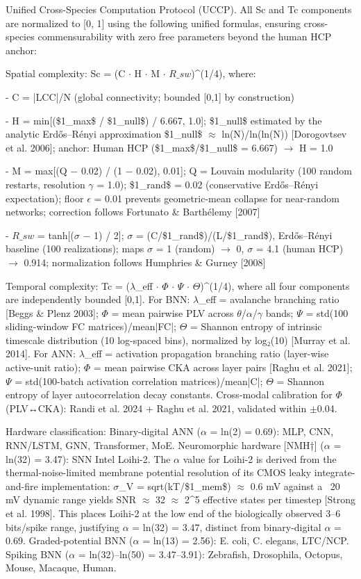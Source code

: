 \documentclass[a4paper,12pt]{article}
\begin{document}
Unified Cross-Species Computation Protocol (UCCP). All Sc and Tc components are normalized to [0, 1] using the following unified formulas, ensuring cross-species commensurability with zero free parameters beyond the human HCP anchor:


Spatial complexity: Sc = (C $\cdot$ H $\cdot$ M $\cdot$ $R\_{sw}$)^(1/4), where:


- C = |LCC|/N (global connectivity; bounded [0,1] by construction)


- H = min[(\$1_{max}\$ / \$1_{null}\$) / 6.667, 1.0]; \$1_{null}\$ estimated by the analytic Erdős–Rényi approximation \$1_{null}\$ $\approx$ ln(N)/ln(ln(N)) [Dorogovtsev et al. 2006]; anchor: Human HCP (\$1_{max}\$/\$1_{null}\$ = 6.667) $\rightarrow$ H = 1.0


- M = max[(Q − 0.02) / (1 − 0.02), 0.01]; Q = Louvain modularity (100 random restarts, resolution $\gamma$ = 1.0); \$1_{rand}\$ = 0.02 (conservative Erdős–Rényi expectation); floor $\epsilon$ = 0.01 prevents geometric-mean collapse for near-random networks; correction follows Fortunato \& Barthélemy [2007]


- $R\_{sw}$ = tanh[($\sigma$ − 1) / 2]; $\sigma$ = (C/\$1_{rand}\$)/(L/\$1_{rand}\$), Erdős–Rényi baseline (100 realizations); maps $\sigma$ = 1 (random) $\rightarrow$ 0, $\sigma$ = 4.1 (human HCP) $\rightarrow$ 0.914; normalization follows Humphries \& Gurney [2008]


Temporal complexity: Tc = ($\lambda$_eff $\cdot$ $\Phi$ $\cdot$ $\Psi$ $\cdot$ $\Theta$)^(1/4), where all four components are independently bounded [0,1]. For BNN: $\lambda$_eff = avalanche branching ratio [Beggs \& Plenz 2003]; $\Phi$ = mean pairwise PLV across $\theta$/$\alpha$/$\gamma$ bands; $\Psi$ = std(100 sliding-window FC matrices)/mean|FC|; $\Theta$ = Shannon entropy of intrinsic timescale distribution (10 log-spaced bins), normalized by log₂(10) [Murray et al. 2014]. For ANN: $\lambda$_eff = activation propagation branching ratio (layer-wise active-unit ratio); $\Phi$ = mean pairwise CKA across layer pairs [Raghu et al. 2021]; $\Psi$ = std(100-batch activation correlation matrices)/mean|C|; $\Theta$ = Shannon entropy of layer autocorrelation decay constants. Cross-modal calibration for $\Phi$ (PLV↔CKA): Randi et al. 2024 + Raghu et al. 2021, validated within $\pm$0.04.


Hardware classification: Binary-digital ANN ($\alpha$ = ln(2) = 0.69): MLP, CNN, RNN/LSTM, GNN, Transformer, MoE. Neuromorphic hardware [NMH†] ($\alpha$ = ln(32) = 3.47): SNN Intel Loihi-2. The $\alpha$ value for Loihi-2 is derived from the thermal-noise-limited membrane potential resolution of its CMOS leaky integrate-and-fire implementation: $\sigma$_V = sqrt(kT/\$1_{mem}\$) $\approx$ 0.6 mV against a ~20 mV dynamic range yields SNR $\approx$ 32 $\approx$ 2^5 effective states per timestep [Strong et al. 1998]. This places Loihi-2 at the low end of the biologically observed 3–6 bits/spike range, justifying $\alpha$ = ln(32) = 3.47, distinct from binary-digital $\alpha$ = 0.69. Graded-potential BNN ($\alpha$ = ln(13) = 2.56): E. coli, C. elegans, LTC/NCP. Spiking BNN ($\alpha$ = ln(32)--ln(50) = 3.47--3.91): Zebrafish, Drosophila, Octopus, Mouse, Macaque, Human.
\end{document}
